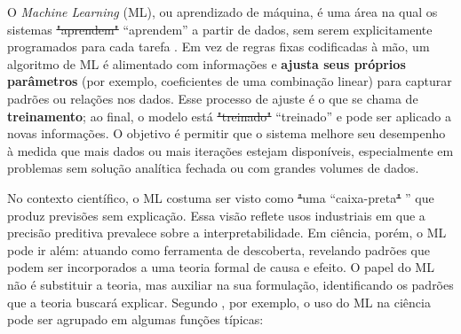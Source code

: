 \documentclass[msc]{on} %
\makeatletter
\providecommand{\DIFaddtex}[1]{{\protect\color{red}#1}} %
\providecommand{\DIFdeltex}[1]{{\protect\color{red}\sout{#1}}} %
\providecommand{\DIFaddbegin}{} %
\providecommand{\DIFaddend}{} %
\providecommand{\DIFdelbegin}{} %
\providecommand{\DIFdelend}{} %
\providecommand{\DIFadd}[1]{\texorpdfstring{\DIFaddtex{#1}}{#1}} %
\providecommand{\DIFdel}[1]{\texorpdfstring{\DIFdeltex{#1}}{}} %
\let\sout@orig\sout %
\renewcommand{\sout}[1]{\ifmmode\text{\sout@orig{\ensuremath{#1}}}\else\sout@orig{#1}\fi} %
\makeatother
\begin{document}
O \textit{Machine Learning} (ML), ou aprendizado de máquina, é uma área na qual os sistemas \DIFdelbegin \DIFdel{"aprendem" }\DIFdelend \DIFaddbegin \DIFadd{``aprendem'' }\DIFaddend a partir de dados, sem serem explicitamente programados para cada tarefa \citep{geron2019maos}. Em vez de regras fixas codificadas à mão, um algoritmo de ML é alimentado com informações e \textbf{ajusta seus próprios parâmetros} (por exemplo, coeficientes de uma combinação linear) para capturar padrões ou relações nos dados. Esse processo de ajuste é o que se chama de \textbf{treinamento}; ao final, o modelo está \DIFdelbegin \DIFdel{"treinado" }\DIFdelend \DIFaddbegin \DIFadd{``treinado'' }\DIFaddend e pode ser aplicado a novas informações. O objetivo é permitir que o sistema melhore seu desempenho à medida que mais dados ou mais iterações estejam disponíveis, especialmente em problemas sem solução analítica fechada ou com grandes volumes de dados.

No contexto científico, o ML costuma ser visto como \DIFdelbegin \DIFdel{"}\DIFdelend \DIFaddbegin \DIFadd{uma ``}\DIFaddend caixa-preta\DIFdelbegin \DIFdel{" }\DIFdelend \DIFaddbegin \DIFadd{'' }\DIFaddend que produz previsões sem explicação. Essa visão reflete usos industriais em que a precisão preditiva prevalece sobre a interpretabilidade. Em ciência, porém, o ML pode ir além: atuando como ferramenta de descoberta, revelando padrões que podem ser incorporados a uma teoria formal de causa e efeito. O papel do ML não é substituir a teoria, mas auxiliar na sua formulação, identificando os padrões que a teoria buscará explicar. Segundo \cite{lopez2020ml}, por exemplo, o uso do ML na ciência pode ser agrupado em algumas funções típicas:
\end{document}

